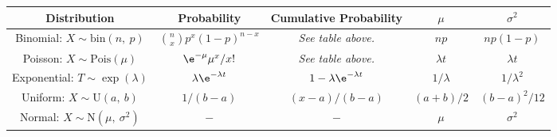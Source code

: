 \documentclass{article}
\begin{document}
\begin{table}[H]
    \centering
    \begin{tabular}{c c c c c}
        \toprule
        \textbf{Distribution}                                    & \textbf{Probability}                            & \textbf{Cumulative Probability}         & \(\mu\)                  & \(\sigma^2\)                \\
        \midrule
        Binomial: \(X\sim \mathrm{bin}\left( n,\: p \right)\)      & \(\binom{n}{x} p^x \left( 1 - p \right)^{n - x}\) & \emph{See table above.}                 & \(np\)                   & \(np\left( 1-p \right)\)    \\
        Poisson: \(X\sim \mathrm{Pois}\left( \mu \right)\)         & \(\e^{-\mu}\mu^x/{x!}\)                           & \emph{See table above.}                 & \(\lambda t\)            & \(\lambda t\)               \\
        Exponential: \(T\sim \exp{\left( \lambda \right)}\)        & \(\lambda \e^{-\lambda t}\)                       & \(1 - \lambda \e^{-\lambda t}\)           & \(1/\lambda\)            & \(1/\lambda^2\)             \\
        Uniform: \(X\sim \mathrm{U}\left( a,\: b \right)\)         & \(1/\left( b-a \right)\)                          & \(\left( x-a \right)/\left( b-a \right)\) & \(\left( a+b \right)/2\) & \(\left( b-a \right)^2/12\) \\
        Normal: \(X\sim \mathrm{N}\left( \mu,\: \sigma^2 \right)\) & \(-\)                                             & \(-\)                                     & \(\mu\)                  & \(\sigma^2\)                \\
        \bottomrule
    \end{tabular}
\end{table}
\end{document}
